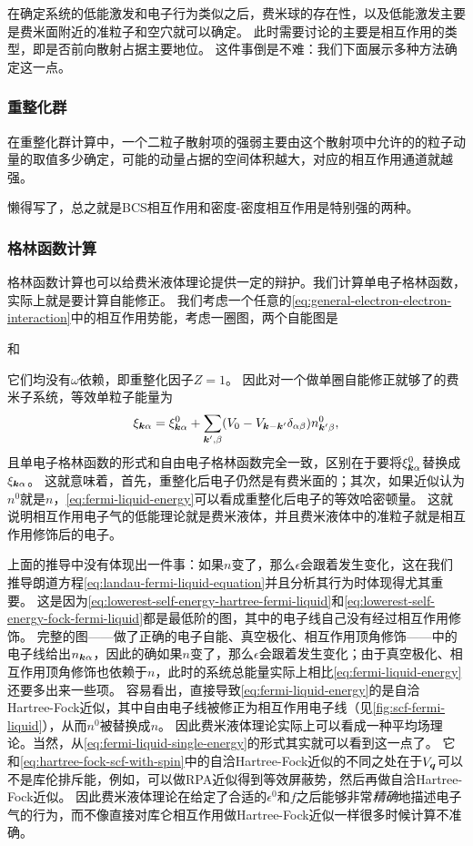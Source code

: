 在确定系统的低能激发和电子行为类似之后，费米球的存在性，以及低能激发主要是费米面附近的准粒子和空穴就可以确定。
此时需要讨论的主要是相互作用的类型，即是否前向散射占据主要地位。
这件事倒是不难：我们下面展示多种方法确定这一点。

\subsubsection{重整化群}

在重整化群计算中，一个二粒子散射项的强弱主要由这个散射项中允许的的粒子动量的取值多少确定，可能的动量占据的空间体积越大，对应的相互作用通道就越强。

懒得写了，总之就是BCS相互作用和密度-密度相互作用是特别强的两种。

\subsubsection{格林函数计算}

格林函数计算也可以给费米液体理论提供一定的辩护。我们计算单电子格林函数，实际上就是要计算自能修正。
我们考虑一个任意的\eqref{eq:general-electron-electron-interaction}中的相互作用势能，考虑一圈图，两个自能图是

和

它们均没有$\omega$依赖，即重整化因子$Z=1$。
因此对一个做单圈自能修正就够了的费米子系统，等效单粒子能量为
\begin{equation}
    \xi_{\vb*{k} \alpha} = \xi^0_{\vb*{k} \alpha} + \sum_{\vb*{k}', \beta} (V_0 - V_{\vb*{k} - \vb*{k}'} \delta_{\alpha \beta}) n_{\vb*{k}' \beta}^0,
\end{equation}
且单电子格林函数的形式和自由电子格林函数完全一致，区别在于要将$\xi^0_{\vb*{k} \alpha}$替换成$\xi_{\vb*{k} \alpha}$。
这就意味着，首先，重整化后电子仍然是有费米面的；其次，如果近似认为$n^0$就是$n$，\eqref{eq:fermi-liquid-energy}可以看成重整化后电子的等效哈密顿量。
这就说明相互作用电子气的低能理论就是费米液体，并且费米液体中的准粒子就是相互作用修饰后的电子。

上面的推导中没有体现出一件事：如果$n$变了，那么$\epsilon$会跟着发生变化，这在我们推导朗道方程\eqref{eq:landau-fermi-liquid-equation}并且分析其行为时体现得尤其重要。
这是因为\eqref{eq:lowerest-self-energy-hartree-fermi-liquid}和\eqref{eq:lowerest-self-energy-fock-fermi-liquid}都是最低阶的图，其中的电子线自己没有经过相互作用修饰。
完整的图——做了正确的电子自能、真空极化、相互作用顶角修饰——中的电子线给出$n_{\vb*{k} \alpha}$，因此的确如果$n$变了，那么$\epsilon$会跟着发生变化；由于真空极化、相互作用顶角修饰也依赖于$n$，此时的系统总能量实际上相比\eqref{eq:fermi-liquid-energy}还要多出来一些项。
容易看出，直接导致\eqref{eq:fermi-liquid-energy}的是自洽Hartree-Fock近似，其中自由电子线被修正为相互作用电子线（见\autoref{fig:scf-fermi-liquid}），从而$n^0$被替换成$n$。
因此费米液体理论实际上可以看成一种平均场理论。当然，从\eqref{eq:fermi-liquid-single-energy}的形式其实就可以看到这一点了。
它和\eqref{eq:hartree-fock-scf-with-spin}中的自洽Hartree-Fock近似的不同之处在于$V_{\vb*{q}}$可以不是库伦排斥能，例如，可以做RPA近似得到等效屏蔽势，然后再做自洽Hartree-Fock近似。
因此费米液体理论在给定了合适的$\epsilon^0$和$f$之后能够非常\emph{精确}地描述电子气的行为，而不像直接对库仑相互作用做Hartree-Fock近似一样很多时候计算不准确。

